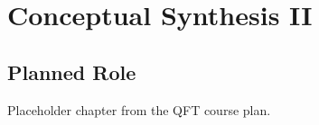 \chapter{Conceptual Synthesis II}

\section{Planned Role}

Placeholder chapter from the QFT course plan.
